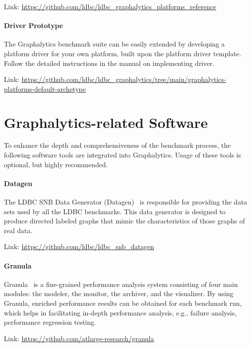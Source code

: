 \quad Link: \url{https://github.com/ldbc/ldbc_graphalytics_platforms_reference}


\paragraph{Driver Prototype} The Graphalytics benchmark suite can be easily extended by developing a platform driver for your own platform, built upon the platform driver template. Follow the detailed instructions in the manual on implementing driver. 

\quad Link: \url{https://github.com/ldbc/ldbc_graphalytics/tree/main/graphalytics-platforms-default-archetype}








\section{Graphalytics-related Software}\label{sec:instructions:related}
To enhance the depth and comprehensiveness of the benchmark process, the following software tools are integrated into Graphalytics. Usage of these tools is optional, but highly recommended.


\paragraph{Datagen} The LDBC SNB Data Generator (Datagen)~\cite{DBLP:conf/sigmod/ErlingALCGPPB15} is responsible for providing the data sets used by all the LDBC benchmarks. This data generator is designed to produce directed labeled graphs that mimic the characteristics of those graphs of real data. 

\quad Link: \url{https://github.com/ldbc/ldbc_snb_datagen}



\paragraph{Granula} Granula~\cite{DBLP:conf/grades/NgaiHHI17} is a fine-grained performance analysis system consisting of four main modules: the modeler, the monitor, the archiver, and the visualizer. 
By using Granula, enriched performance results can be obtained for each benchmark run, which helps in facilitating in-depth performance analysis, e.g., failure analysis, performance regression testing.

\quad Link: \url{https://github.com/atlarge-research/granula}







